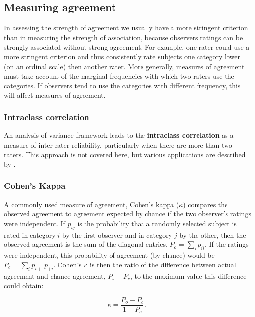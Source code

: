 \subsection{Measuring agreement}\label{sec:agreemeas}
In assessing the strength of agreement we usually have a more
stringent criterion than in measuring the strength of association,
because
observers ratings can be strongly associated without strong agreement.
For example, one rater could use a more stringent criterion and thus consistently rate subjects one category lower (on an ordinal scale) then another rater.
More generally, measures of agreement must take account of the
marginal frequencies with which two raters use the categories.
If observers tend to use the categories
       with different frequency, this will affect measures of
       agreement.

\subsubsection{Intraclass correlation}
An analysis of variance framework leads to the {\bf intraclass correlation}
as a measure of inter-rater reliability, particularly when there are
more than two raters.
This approach is not covered here, but various applications are described
by \citet{ShroutFleiss:79}.

\subsubsection{Cohen's Kappa}
A commonly used measure of agreement,
Cohen's kappa (\(\kappa\))
\citep{Cohen:60,Cohen:68} compares the observed agreement to agreement expected by chance if the two observer's
ratings were independent.
If $p_{ij}$ is the probability that a randomly selected subject is
rated in category $i$ by the first observer and in category $j$ by
the other, then the observed agreement is the sum of the diagonal
entries,  \(P_o  = \sum_i p_{ii}\).  If the ratings were independent,
this probability of agreement (by chance) would be \(P_c = \sum_i p_{i+} \,  p_{+i}\).
Cohen's $\kappa$ is then the ratio of the difference between actual
agreement and chance agreement, $P_o - P_c$, to the maximum value
this difference could obtain:

\begin{equation}\label{eq:kappa}
  \kappa =  \frac{ P_o - P_c } { 1 - P_c }
  \period
\end{equation}

